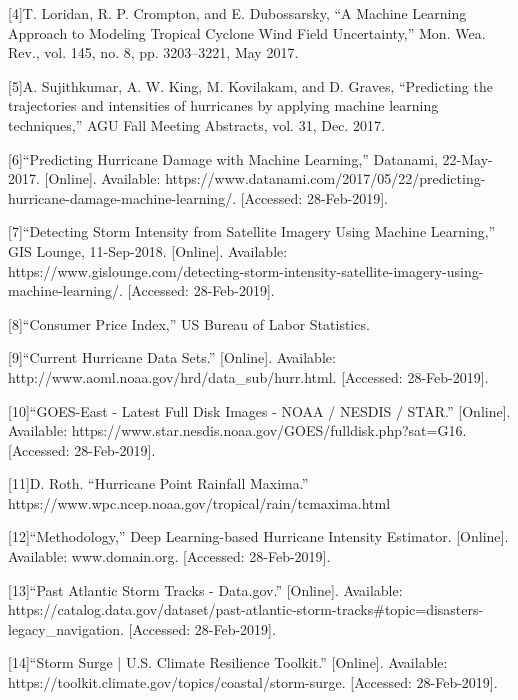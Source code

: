 \documentclass[letterpaper, 10 pt, conference]{ieeeconf}  %
\begin{document}
[4]T. Loridan, R. P. Crompton, and E. Dubossarsky, “A Machine Learning Approach to Modeling Tropical Cyclone Wind Field Uncertainty,” Mon. Wea. Rev., vol. 145, no. 8, pp. 3203–3221, May 2017.

[5]A. Sujithkumar, A. W. King, M. Kovilakam, and D. Graves, “Predicting the trajectories and intensities of hurricanes by applying machine learning techniques,” AGU Fall Meeting Abstracts, vol. 31, Dec. 2017.

[6]“Predicting Hurricane Damage with Machine Learning,” Datanami, 22-May-2017. [Online]. Available: https://www.datanami.com/2017/05/22/predicting-hurricane-damage-machine-learning/. [Accessed: 28-Feb-2019].

[7]“Detecting Storm Intensity from Satellite Imagery Using Machine Learning,” GIS Lounge, 11-Sep-2018. [Online]. Available: https://www.gislounge.com/detecting-storm-intensity-satellite-imagery-using-machine-learning/. [Accessed: 28-Feb-2019].

[8]“Consumer Price Index,” US Bureau of Labor Statistics.

[9]“Current Hurricane Data Sets.” [Online]. Available: http://www.aoml.noaa.gov/hrd/data\_sub/hurr.html. [Accessed: 28-Feb-2019].

[10]“GOES-East - Latest Full Disk Images - NOAA / NESDIS / STAR.” [Online]. Available: https://www.star.nesdis.noaa.gov/GOES/fulldisk.php?sat=G16. [Accessed: 28-Feb-2019].

[11]D. Roth. “Hurricane Point Rainfall Maxima.” https://www.wpc.ncep.noaa.gov/tropical/rain/tcmaxima.html

[12]“Methodology,” Deep Learning-based Hurricane Intensity Estimator. [Online]. Available: www.domain.org. [Accessed: 28-Feb-2019].

[13]“Past Atlantic Storm Tracks - Data.gov.” [Online]. Available: https://catalog.data.gov/dataset/past-atlantic-storm-tracks#topic=disasters-legacy\_navigation. [Accessed: 28-Feb-2019].

[14]“Storm Surge | U.S. Climate Resilience Toolkit.” [Online]. Available: https://toolkit.climate.gov/topics/coastal/storm-surge. [Accessed: 28-Feb-2019].
\end{document}
